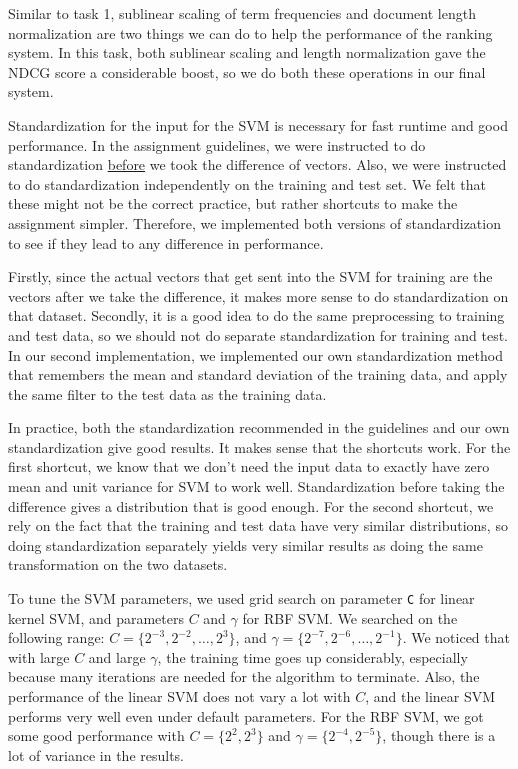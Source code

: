 \documentclass[10pt,twocolumn]{article}
\begin{document}
Similar to task 1, sublinear scaling of term frequencies and document length normalization are two things we can do to help the performance of the ranking system. In this task, both sublinear scaling and length normalization gave the NDCG score a considerable boost, so we do both these operations in our final system.

Standardization for the input for the SVM is necessary for fast runtime and good performance. In the assignment guidelines, we were instructed to do standardization \underline{before} we took the difference of vectors. Also, we were instructed to do standardization independently on the training and test set. We felt that these might not be the correct practice, but rather shortcuts to make the assignment simpler. Therefore, we implemented both versions of standardization to see if they lead to any difference in performance.

Firstly, since the actual vectors that get sent into the SVM for training are the vectors after we take the difference, it makes more sense to do standardization on that dataset. Secondly, it is a good idea to do the same preprocessing to training and test data, so we should not do separate standardization for training and test. In our second implementation, we implemented our own standardization method that remembers the mean and standard deviation of the training data, and apply the same filter to the test data as the training data.

In practice, both the standardization recommended in the guidelines and our own standardization give good results. It makes sense that the shortcuts work. For the first shortcut, we know that we don't need the input data to exactly have zero mean and unit variance for SVM to work well. Standardization before taking the difference gives a distribution that is good enough. For the second shortcut, we rely on the fact that the training and test data have very similar distributions, so doing standardization separately yields very similar results as doing the same transformation on the two datasets.

To tune the SVM parameters, we used grid search on parameter \texttt{C} for linear kernel SVM, and parameters $C$ and $\gamma$ for RBF SVM. We searched on the following range: $C=\{2^{-3},2^{-2},\dots,2^{3}\}$, and $\gamma=\{2^{-7},2^{-6},\dots,2^{-1}\}$. We noticed that with large $C$ and large $\gamma$, the training time goes up considerably, especially because many iterations are needed for the algorithm to terminate. Also, the performance of the linear SVM does not vary a lot with $C$, and the linear SVM performs very well even under default parameters. For the RBF SVM, we got some good performance with $C=\{2^{2},2^{3}\}$ and $\gamma=\{2^{-4},2^{-5}\}$, though there is a lot of variance in the results.
\end{document}
